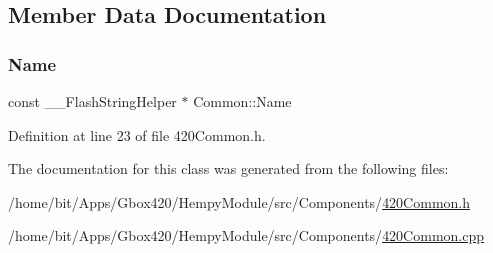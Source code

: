\subsection{Member Data Documentation}
\mbox{\label{class_common_aeea91a726dbe988e515057b32ba0726f}} 
\subsubsection{\texorpdfstring{Name}{Name}}
{\footnotesize\ttfamily const \+\_\+\+\_\+\+Flash\+String\+Helper $\ast$ Common\+::\+Name}



Definition at line 23 of file 420\+Common.\+h.



The documentation for this class was generated from the following files\+:\begin{DoxyCompactItemize}
\item 
/home/bit/\+Apps/\+Gbox420/\+Hempy\+Module/src/\+Components/\hyperlink{_hempy_module_2src_2_components_2420_common_8h}{420\+Common.\+h}\item 
/home/bit/\+Apps/\+Gbox420/\+Hempy\+Module/src/\+Components/\hyperlink{_hempy_module_2src_2_components_2420_common_8cpp}{420\+Common.\+cpp}\end{DoxyCompactItemize}
